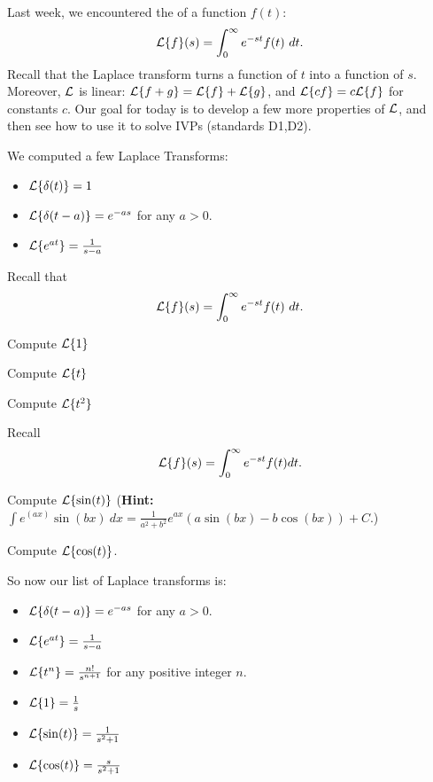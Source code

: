 \begin{applicationActivities}

\begin{observation}
Last week, we encountered the  of a function \(f(t)\):
\[\L\{f\}(s)=\int _0 ^\infty e^{-st}f(t)\ dt.\]
\vfill
Recall that the Laplace transform turns a function of \(t\) into a function of \(s\).
\vfill
Moreover, \(\mathcal{L}\) is linear: \(\mathcal{L}\{f+g\}=\mathcal{L}\{f\}+\mathcal{L}\{g\}\), and \(\mathcal{L}\{cf\}=c\mathcal{L}\{f\}\) for constants \(c\).
\vfill
Our goal for today is to develop a few more properties of \(\mathcal{L}\), and then see how to use it to solve IVPs (standards D1,D2).
\end{observation}

\begin{observation}
We computed a few Laplace Transforms:
\begin{itemize}
\item \(\mathcal{L}\{\delta(t)\} = 1\)
\item \(\mathcal{L}\{\delta(t-a)\} = e^{-as}\) for any \(a>0\).
\item \(\mathcal{L}\{e^{at}\} = \frac{1}{s-a}\) 
\end{itemize}
\end{observation}

\begin{activity}{15}
Recall that \[\L\{f\}(s)=\int _0 ^\infty e^{-st} f(t)\ dt.\]
\begin{subactivity}
Compute \(\mathcal{L}\{1\}\)
\end{subactivity}
\begin{subactivity}
Compute \(\mathcal{L}\{t\}\)
\end{subactivity}
\begin{subactivity}
Compute \(\mathcal{L}\{t^2\}\)
\end{subactivity}
\end{activity}


\begin{activity}{10}
Recall \[\mathcal{L}\{f\}(s)=\int _0 ^\infty e^{-st}f(t)dt.\]
\begin{subactivity}
Compute \(\mathcal{L}\{\sin(t)\}\) ({\bf Hint: } \(\int e^(ax)\sin(bx)\ dx = \frac{1}{a^2+b^2} e^{ax}\left(a \sin(bx)-b\cos(bx)\right)+C\).)
\end{subactivity}
\begin{subactivity}
Compute \(\mathcal{L}\{\cos(t)\}\).
\end{subactivity}
\end{activity}

\begin{observation}
So now our list of Laplace transforms is:
\begin{itemize}
\item \(\mathcal{L}\{\delta(t-a)\} = e^{-as}\) for any \(a>0\).
\item \(\mathcal{L}\{e^{at}\} = \frac{1}{s-a}\) 
\item \(\mathcal{L}\{t^n\} = \frac{n!}{s^{n+1}}\) for any positive integer \(n\).
\item \(\mathcal{L}\{1\} = \frac{1}{s}\)
\item \(\mathcal{L}\{\sin(t)\} = \frac{1}{s^2+1}\)
\item \(\mathcal{L}\{\cos(t)\} = \frac{s}{s^2+1}\)
\end{itemize}
\end{observation}


\end{applicationActivities}
